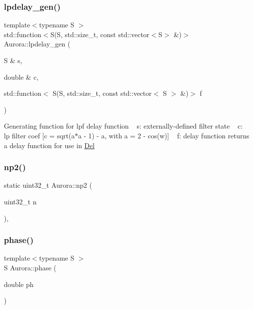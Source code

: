 \subsubsection{\texorpdfstring{lpdelay\+\_\+gen()}{lpdelay\_gen()}}
{\footnotesize\ttfamily template$<$typename S $>$ \\
std\+::function$<$S(S, std\+::size\+\_\+t, const std\+::vector$<$S$>$ \&)$>$ Aurora\+::lpdelay\+\_\+gen (\begin{DoxyParamCaption}\item[{S \&}]{s,  }\item[{double \&}]{c,  }\item[{std\+::function$<$ S(S, std\+::size\+\_\+t, const std\+::vector$<$ S $>$ \&)$>$}]{f }\end{DoxyParamCaption})}

Generating function for lpf delay function ~\newline
s\+: externally-\/defined filter state ~\newline
c\+: lp filter coef \mbox{[}c = sqrt(a$\ast$a -\/ 1) -\/ a, with a = 2 -\/ cos(w)\mbox{]} ~\newline
f\+: delay function returns a delay function for use in \hyperlink{class_aurora_1_1_del}{Del} \mbox{\label{namespace_aurora_a49b6f6d92479d80271ced42627154066}} 
\subsubsection{\texorpdfstring{np2()}{np2()}}
{\footnotesize\ttfamily static uint32\+\_\+t Aurora\+::np2 (\begin{DoxyParamCaption}\item[{uint32\+\_\+t}]{n }\end{DoxyParamCaption})\hspace{0.3cm}{\ttfamily [inline]}, {\ttfamily [static]}}

\mbox{\label{namespace_aurora_a2fab91108d29c7101741bcd2ebe1ba72}} 
\subsubsection{\texorpdfstring{phase()}{phase()}}
{\footnotesize\ttfamily template$<$typename S $>$ \\
S Aurora\+::phase (\begin{DoxyParamCaption}\item[{double}]{ph }\end{DoxyParamCaption})}


